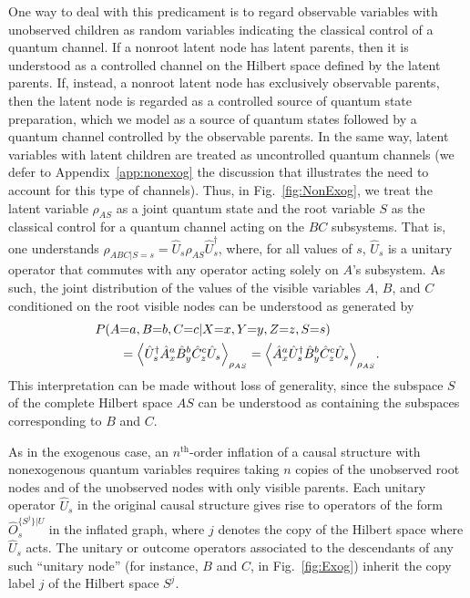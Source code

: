 \documentclass[superscriptaddress,aps,prx,nofootinbib,twocolumn,twoside,reprint,letterpaper,longbibliography]{revtex4-2}
\DeclarePairedDelimiter{\expec}{\langle}{\rangle}
\begin{document}
One way to deal with this predicament is to regard observable variables with unobserved children as random variables indicating the classical control of a quantum channel.
If a nonroot latent node has latent parents, then it is understood as a controlled channel on the Hilbert space defined by the latent parents.
If, instead, a nonroot latent node has exclusively observable parents, then the latent node is regarded as a controlled source of quantum state preparation, which we model as a source of quantum states followed by a quantum channel controlled by the observable parents.
In the same way, latent variables with latent children are treated as uncontrolled quantum channels (we defer to Appendix~\ref{app:nonexog} the discussion that illustrates the need to account for this type of channels).
Thus, in Fig.~\ref{fig:NonExog}, we treat the latent variable $\rho_{AS}$ as a joint quantum state and the root variable $S$ as the classical control for a quantum channel acting on the $BC$ subsystems.
That is, one understands ${\rho_{ABC|S=s}=\hat{U}_s \rho_{AS} \hat{U}^{\dagger}_s}$, where, for all values of $s$, $\hat{U}_s$ is a unitary operator that commutes with any operator acting solely on $A$'s subsystem.
As such, the joint distribution of the values of the visible variables $A$, $B$, and $C$ conditioned on the root visible nodes can be understood as generated by
\begin{align*}
  P(A&{=}a,B{=}b,C{=}c|X{=}x,Y{=}y,Z{=}z,S{=}s)\\
  & =\expec*{ \hat{U}^{\dagger}_s \hat{A}^a_x \hat{B}^b_y \hat{C}^c_z \hat{U}_s}_{\rho_{AS}} =\expec*{\hat{A}^a_x \hat{U}^{\dagger}_s \hat{B}^b_y \hat{C}^c_z \hat{U}_s}_{\rho_{AS}}.
\end{align*}
This interpretation can be made without loss of generality, since the subspace $S$ of the complete Hilbert space $AS$ can be understood as containing the subspaces corresponding to $B$ and $C$.

As in the exogenous case, an $n^\text{th}$-order inflation of a causal structure with nonexogenous quantum variables requires taking $n$ copies of the unobserved root nodes and of the unobserved nodes with only visible parents. Each unitary operator $\hat{U}_s$ in the original causal structure gives rise to operators of the form $\hat{O}^{\{S^j\}|U}_{s}$ in the inflated graph, where $j$ denotes the copy of the Hilbert space where $\hat{U}_s$ acts. The unitary or outcome operators associated to the descendants of any such ``unitary node'' (for instance, $B$ and $C$, in Fig.~\ref{fig:Exog}) inherit the copy label $j$ of the Hilbert space $S^j$.
\end{document}
